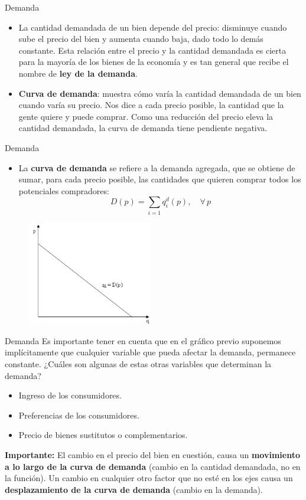 \documentclass{beamer}
\begin{document}
\begin{frame}{Demanda}
\begin{itemize}
    \item La cantidad demandada de un bien depende del precio: disminuye
cuando sube el precio del bien y aumenta cuando baja, dado todo lo
demás constante. Esta relación entre el precio y la cantidad
demandada es cierta para la mayoría de los bienes de la economía y es
tan general que recibe el nombre de \textbf{ley de la demanda}.
\item \textbf{Curva de demanda}: muestra cómo varía la cantidad demandada de
un bien cuando varía su precio. Nos dice a cada precio posible, la
cantidad que la gente quiere y puede comprar. Como una reducción
del precio eleva la cantidad demandada, la curva de demanda tiene
pendiente negativa.
\end{itemize}
\end{frame}


\begin{frame}{Demanda}
\begin{itemize}
    \item La \textbf{curva de demanda} se refiere a la demanda agregada, que se obtiene
de sumar, para cada precio posible, las cantidades que quieren comprar
todos los potenciales compradores:
\[
D(p) = \sum_{i=1}q_{i}^{d}(p), \quad \forall \, p
\]
\end{itemize}

\begin{figure}
\includegraphics[width=5.5cm]{figures1/demand.png}
\end{figure}
\end{frame}

\begin{frame}{Demanda}
Es importante tener en cuenta que en el gráfico previo suponemos
implícitamente que cualquier variable que pueda afectar la demanda,
permanece constante. ¿Cuáles son algunas de estas otras variables que
determinan la demanda?

\begin{itemize}
    \item Ingreso de los consumidores.
    \item Preferencias de los consumidores.
    \item Precio de bienes sustitutos o complementarios.
\end{itemize}

\textbf{Importante:} El cambio en el precio del bien en cuestión, causa un
\textbf{movimiento a lo largo de la curva de demanda} (cambio en la cantidad demandada, no en la función). Un cambio en cualquier otro factor que no esté en los ejes causa un
\textbf{desplazamiento de la curva de demanda} (cambio en la demanda). 
\end{frame}
\end{document}
